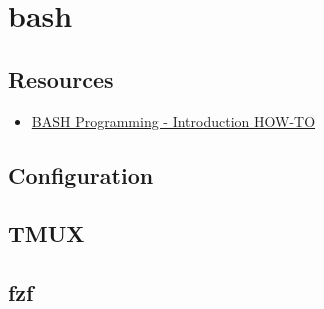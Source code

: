 \chapter{bash} 
\section{Resources}%
\label{sec:resources}
\begin{itemize}
  \item \href{https://tldp.org/HOWTO/Bash-Prog-Intro-HOWTO.html#toc5}{BASH Programming - Introduction HOW-TO} 
\end{itemize}

\section{Configuration} 

\section{TMUX} 

\section{fzf} 
